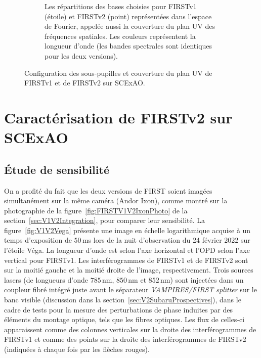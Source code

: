 \begin{figure}[ht!]
\begin{subfigure}[t]{0.55\textwidth}
        \caption{Les répartitions des bases choisies pour FIRSTv1 (étoile) et FIRSTv2 (point) représentées dans l'espace de Fourier, appelée aussi la couverture du plan UV des fréquences spatiales. Les couleurs représentent la longueur d'onde (les bandes spectrales sont identiques pour les deux versions).}
        \label{fig:SegUVSubaruB}
    \end{subfigure}
    \caption[Configuration des sous-pupilles et couverture du plan UV de FIRSTv1 et de FIRSTv2 sur SCExAO.]{Configuration des sous-pupilles et couverture du plan UV de FIRSTv1 et de FIRSTv2 sur SCExAO.}
    \label{fig:SegUVSubaru}
\end{figure}


\section{Caractérisation de FIRSTv2 sur SCExAO}

\subsection{Étude de sensibilité}
\label{sec:V1V2Throughput}

On a profité du fait que les deux versions de \ac{FIRST} soient imagées simultanément sur la même caméra (Andor Ixon), comme montré sur la photographie de la figure~\ref{fig:FIRSTV1V2IxonPhoto} de la section~\ref{sec:V1V2Integration}, pour comparer leur sensibilité. La figure~\ref{fig:V1V2Vega} présente une image en échelle logarithmique acquise à un temps d'exposition de $50 \,$ms lors de la nuit d'observation du 24 février 2022 sur l'étoile Véga. La longueur d'onde est selon l'axe horizontal et l'\ac{OPD} selon l'axe vertical pour \ac{FIRSTv1}. Les interférogrammes de \ac{FIRSTv1} et de \ac{FIRSTv2} sont sur la moitié gauche et la moitié droite de l'image, respectivement. Trois sources lasers (de longueurs d'onde $785 \,$nm, $850 \,$nm et $852 \,$nm) sont injectées dans un coupleur fibré intégré juste avant le séparateur \textit{VAMPIRES/FIRST splitter} sur le banc visible (discussion dans la section~\ref{sec:V2SubaruProspectives}), dans le cadre de tests pour la mesure des perturbations de phase induites par des éléments du montage optique, tels que les fibres optiques. Les flux de celles-ci apparaissent comme des colonnes verticales sur la droite des interférogrammes de \ac{FIRSTv1} et comme des points sur la droite des interférogrammes de \ac{FIRSTv2} (indiquées à chaque fois par les flèches rouges).

